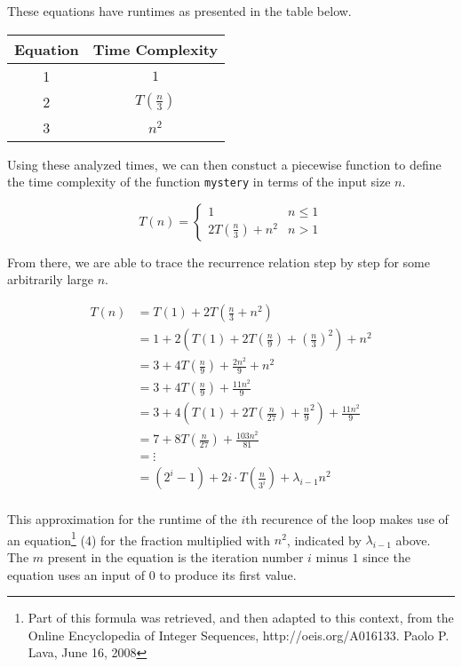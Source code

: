 \documentclass[12pt]{article}
\begin{document}
These equations have runtimes as presented in the table below.

\begin{center}
\begin{tabular}{c|c}
Equation & Time Complexity \\
\hline
1 & $1$ \\
2 & $T(\frac{n}{3})$ \\
3 & $n^2$
\end{tabular}
\end{center}

Using these analyzed times, we can then constuct a piecewise function to define the time complexity of the function \texttt{mystery} in terms of the input size $n$.

\[ T(n) = \begin{cases}
    1 & n \leq 1 \\
    2 T(\frac{n}{3}) + n^2 & n > 1
\end{cases} \]

From there, we are able to trace the recurrence relation step by step for some arbitrarily large $n$.

\begin{align*}
    T(n) &= T(1) + 2 T(\frac{n}{3} + n^2) \\
    &= 1 + 2 (T(1) + 2T(\frac{n}{9}) + (\frac{n}{3})^2) + n^2 \\
    &= 3 + 4T(\frac{n}{9}) + \frac{2n^2}{9} + n^2 \\
    &= 3 + 4T(\frac{n}{9}) + \frac{11n^2}{9} \\
    &= 3 + 4 (T(1) + 2T(\frac{n}{27}) + \frac{n}{9}^2) + \frac{11n^2}{9} \\
    &= 7 + 8T(\frac{n}{27}) + \frac{103n^2}{81} \\
    &= \vdots \\
    &= (2^i - 1) + 2i \cdot T(\frac{n}{3^i}) + \lambda_{i-1}n^2
\end{align*} \\

This approximation for the runtime of the $i$th recurence of the loop makes use of an equation\footnote{Part of this formula was retrieved, and then adapted to this context, from the Online Encyclopedia of Integer Sequences, http://oeis.org/A016133. Paolo P. Lava, June 16, 2008} (4) for the fraction multiplied with $n^2$, indicated by $\lambda_{i-1}$ above. The $m$ present in the equation is the iteration number $i$ minus $1$ since the equation uses an input of $0$ to produce its first value.
\end{document}
